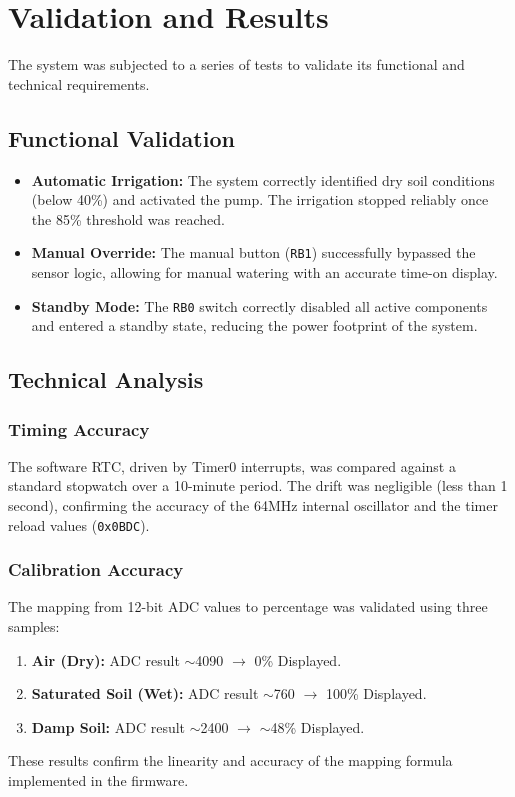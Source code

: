\section{Validation and Results}
The system was subjected to a series of tests to validate its functional and technical requirements.

\subsection{Functional Validation}
\begin{itemize}
    \item \textbf{Automatic Irrigation:} The system correctly identified dry soil conditions (below 40\%) and activated the pump. The irrigation stopped reliably once the 85\% threshold was reached.
    \item \textbf{Manual Override:} The manual button (\texttt{RB1}) successfully bypassed the sensor logic, allowing for manual watering with an accurate time-on display.
    \item \textbf{Standby Mode:} The \texttt{RB0} switch correctly disabled all active components and entered a standby state, reducing the power footprint of the system.
\end{itemize}

\subsection{Technical Analysis}
\subsubsection{Timing Accuracy}
The software RTC, driven by Timer0 interrupts, was compared against a standard stopwatch over a 10-minute period. The drift was negligible (less than 1 second), confirming the accuracy of the 64MHz internal oscillator and the timer reload values (\texttt{0x0BDC}).

\subsubsection{Calibration Accuracy}
The mapping from 12-bit ADC values to percentage was validated using three samples:
\begin{enumerate}
    \item \textbf{Air (Dry):} ADC result $\sim$4090 $\rightarrow$ 0\% Displayed.
    \item \textbf{Saturated Soil (Wet):} ADC result $\sim$760 $\rightarrow$ 100\% Displayed.
    \item \textbf{Damp Soil:} ADC result $\sim$2400 $\rightarrow$ $\sim$48\% Displayed.
\end{enumerate}
These results confirm the linearity and accuracy of the mapping formula implemented in the firmware.


